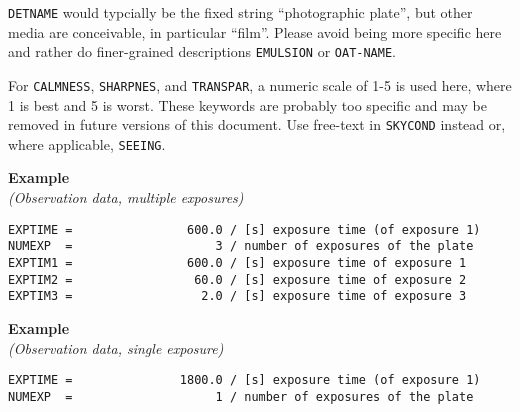 \documentclass[11pt]{ivoa}
\newcommand\cardname[1]{\texttt{\color{keyword}#1}}
\newenvironment{fitsexample}[1]
{\bigskip\noindent\textbf{Example}\\\textit{(#1)\smallskip}}
{\medskip}
\begin{document}
\cardname{DETNAME} would typcially be the fixed string ``photographic
plate'', but other media are conceivable, in particular ``film''.
Please avoid being more specific here and rather do finer-grained
descriptions \cardname{EMULSION} or \cardname{OAT-NAME}.

For \cardname{CALMNESS}, \cardname{SHARPNES}, and \cardname{TRANSPAR}, a
numeric scale of 1-5 is used here, where 1 is best and 5 is worst.
These keywords are probably too specific and may be removed in future
versions of this document.  Use free-text in \cardname{SKYCOND} instead
or, where applicable, \cardname{SEEING}.

\begin{fitsexample}{Observation data, multiple exposures}
\begin{lstlisting}
EXPTIME =                600.0 / [s] exposure time (of exposure 1)
NUMEXP  =                    3 / number of exposures of the plate
EXPTIM1 =                600.0 / [s] exposure time of exposure 1
EXPTIM2 =                 60.0 / [s] exposure time of exposure 2
EXPTIM3 =                  2.0 / [s] exposure time of exposure 3
\end{lstlisting}
\end{fitsexample}

\begin{fitsexample}{Observation data, single exposure}
\begin{lstlisting}
EXPTIME =               1800.0 / [s] exposure time (of exposure 1)
NUMEXP  =                    1 / number of exposures of the plate
\end{lstlisting}
\end{fitsexample}
\end{document}
